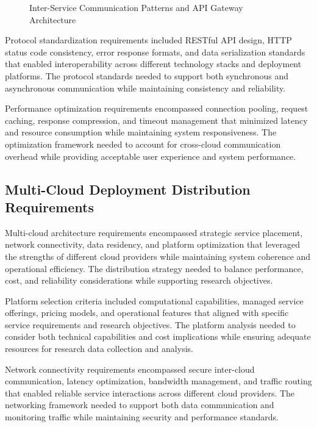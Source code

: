 \begin{figure}[H]
\centering
\caption{Inter-Service Communication Patterns and API Gateway Architecture}
\label{fig:inter-service-communication}
\end{figure}

Protocol standardization requirements included RESTful API design, HTTP status code consistency, error response formats, and data serialization standards that enabled interoperability across different technology stacks and deployment platforms. The protocol standards needed to support both synchronous and asynchronous communication while maintaining consistency and reliability.

Performance optimization requirements encompassed connection pooling, request caching, response compression, and timeout management that minimized latency and resource consumption while maintaining system responsiveness. The optimization framework needed to account for cross-cloud communication overhead while providing acceptable user experience and system performance.

\subsection{Multi-Cloud Deployment Distribution Requirements}

Multi-cloud architecture requirements encompassed strategic service placement, network connectivity, data residency, and platform optimization that leveraged the strengths of different cloud providers while maintaining system coherence and operational efficiency. The distribution strategy needed to balance performance, cost, and reliability considerations while supporting research objectives.

Platform selection criteria included computational capabilities, managed service offerings, pricing models, and operational features that aligned with specific service requirements and research objectives. The platform analysis needed to consider both technical capabilities and cost implications while ensuring adequate resources for research data collection and analysis.

Network connectivity requirements encompassed secure inter-cloud communication, latency optimization, bandwidth management, and traffic routing that enabled reliable service interactions across different cloud providers. The networking framework needed to support both data communication and monitoring traffic while maintaining security and performance standards.

